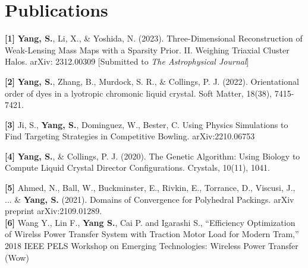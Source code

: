 \documentclass[letterpaper,11pt]{article}
\newcommand{\resumeSubHeadingListStart}{\begin{itemize}[leftmargin=0.15in, label={}]}
\newcommand{\resumeSubHeadingListEnd}{\end{itemize}}
\begin{document}
\section{Publications}
  \vspace{3pt}
  \resumeSubHeadingListStart
    \small{\item{
        \textbf{[1]}{ \textbf{Yang, S.}, Li, X., \& Yoshida, N. (2023). Three-Dimensional Reconstruction of Weak-Lensing Mass Maps with a Sparsity Prior. II. Weighing Triaxial Cluster Halos. arXiv: 2312.00309 [Submitted to \textit{The Astrophysical Journal}]}

    
        \textbf{[2]}{ \textbf{Yang, S.}, Zhang, B., Murdock, S. R., \& Collings, P. J. (2022). Orientational order of dyes in a lyotropic chromonic liquid crystal. Soft Matter, 18(38), 7415-7421. } \\ \vspace{3pt}

        \textbf{[3]}{ Ji, S., \textbf{Yang, S.}, Dominguez, W., Bester, C. Using Physics Simulations to Find Targeting Strategies in Competitive Bowling. arXiv:2210.06753}
        
        \textbf{[4]}{ \textbf{Yang, S.}, \& Collings, P. J. (2020). The Genetic Algorithm: Using Biology to Compute Liquid Crystal Director Configurations. Crystals, 10(11), 1041. } \\ \vspace{3pt}
    
        \textbf{[5]}{ Ahmed, N., Ball, W., Buckminster, E., Rivkin, E., Torrance, D., Viscusi, J., ... \& \textbf{Yang, S.} (2021). Domains of Convergence for Polyhedral Packings. arXiv preprint arXiv:2109.01289.} \\ \vspace{3pt}
        \textbf{[6]} Wang Y., Lin F., \textbf{Yang S.}, Cai P. and Igarashi S., ``Efficiency Optimization of Wirelss Power Transfer System with Traction Motor Load for Modern Tram,'' 2018 IEEE PELS Workshop on Emerging Technologies: Wireless Power Transfer (Wow)
        
        
        
        
    }}
  \resumeSubHeadingListEnd
  
\end{document}
